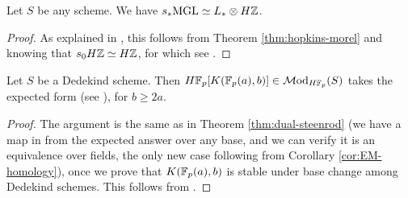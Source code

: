\documentclass{amsart}
\renewcommand{\NB}[1]{}
\numberwithin{proposition}{section}
\numberwithin{equation}{section}
\begin{document}
\begin{theorem}
Let $S$ be any scheme.
We have $s_* \mathrm{MGL} \simeq L_* \otimes H\mathbb{Z}$.
\end{theorem}
\begin{proof}
As explained in \cite[Theorem 4.6]{spitzweck2010relations}, this follows from Theorem \ref{thm:hopkins-morel} and knowing that $s_0H\mathbb{Z} \simeq H\mathbb{Z}$, for which see \cite[Theorem~1.6]{bachmann-elmanto-morrow}.
\end{proof}

\begin{theorem} \label{thm:EM} \NB{can this be generalized to all schemes?}
Let $S$ be a Dedekind scheme.
Then $H\mathbb{F}_p[K(\mathbb{F}_p(a), b)] \in \mathcal{M}\mathrm{od}_{H\mathbb{F}_p}(S)$ takes the expected form (see \cite[Theorem 3.16]{bachmann-wilson}), for $b \ge 2a$.
\end{theorem}
\begin{proof}
The argument is the same as in Theorem \ref{thm:dual-steenrod} (we have a map in from the expected answer over any base, and we can verify it is an equivalence over fields, the only new case following from Corollary \ref{cor:EM-homology}), once we prove that $K(\mathbb{F}_p(a), b)$ is stable under base change among Dedekind schemes.
This follows from \cite[Proposition 7.4]{bachmann-elmanto-morrow}.
\end{proof}
\end{document}
